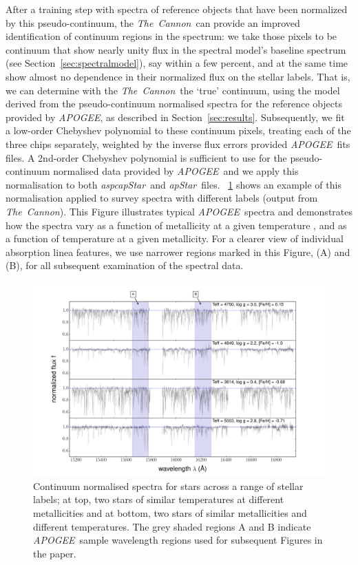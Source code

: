 \documentclass[12pt, preprint]{aastex}
\newcommand{\sectionname}{Section}
\newcommand{\tc}{\textsl{The~Cannon}}
\newcommand{\apogee}{\textsl{APOGEE}}
\newcommand{\aspcapstar}{\textsl{aspcapStar}}
\newcommand{\apstar}{\textsl{apStar}}
\begin{document}
After a training step with spectra of reference objects that have been  normalized  by this pseudo-continuum,
the \tc\ can provide an improved identification of continuum regions in the spectrum: 
we take those pixels to be continuum that show nearly unity flux in the spectral model's baseline spectrum (see \sectionname~\ref{sec:spectralmodel}), 
say within a few percent, and at the same time show almost no dependence in their normalized flux on the stellar labels.
That is, we can determine with the \tc\ the `true' continuum, using the model derived from the pseudo-continuum normalised spectra for the reference objects provided by \apogee, as described in \sectionname~\ref{sec:results}. Subsequently, we fit a low-order Chebyshev polynomial to these continuum pixels,
 treating each of the three chips separately, weighted by the inverse flux errors provided \apogee\ fits files. A 2nd-order Chebyshev polynomial is sufficient to use for the pseudo-continuum normalised data provided by \apogee\ and we apply this normalisation to both \aspcapstar\ and  \apstar\ files. 
\figurename~\ref{fig:norm} shows an example of this normalisation applied to survey spectra with different labels (output from \tc). 
This Figure illustrates typical \apogee\ spectra and demonstrates how the spectra 
vary as a function of metallicity at a given temperature , and as a function of temperature at a given metallicity. 
For a clearer view of individual absorption linea features, we use narrower regions marked in this Figure, (A) and (B), for all subsequent examination of the spectral data. 


\begin{figure}[h!]
  \includegraphics[width=\hsize]{./plots/four_examples3.pdf}
\caption{Continuum normalised spectra for stars across a range of stellar labels; at top, two stars of similar temperatures at different metallicities and at bottom, two stars of similar metallicities and different temperatures. The grey shaded regions A and B indicate \apogee\ sample wavelength regions used for subsequent Figures in the paper.}
\label{fig:norm}
\end{figure}
\end{document}
